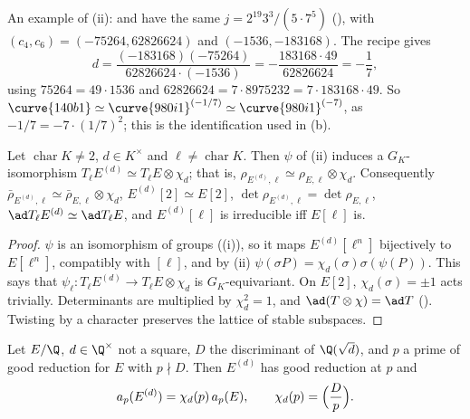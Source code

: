 \noindent An example of (ii):  and  have the same $j=2^{19}3^3/(5\cdot7^5)$ (), with
$(c_4,c_6)=(-75264,62826624)$ and $(-1536,-183168)$. The recipe gives
\[
d=\frac{(-183168)(-75264)}{62826624\cdot(-1536)}=-\frac{183168\cdot49}{62826624}=-\frac17,
\]
using $75264=49\cdot1536$ and $62826624=7\cdot8975232=7\cdot183168\cdot49$. So $\curve{140b1}\simeq\curve{980i1}^{(-1/7)}\simeq\curve{980i1}^{(-7)}$, as $-1/7=-7\cdot(1/7)^2$; this is the
identification used in (b).

\begin{theorem}\label{thm:ellcurves:twistgal}
Let $\operatorname{char}K\ne2$, $d\in K^\times$ and $\ell\ne\operatorname{char}K$. Then $\psi$ of (ii) induces a $G_K$-isomorphism $T_\ell E^{(d)}\simeq T_\ell E\otimes\chi_d$; that is,
$\rho_{E^{(d)},\ell}\simeq\rho_{E,\ell}\otimes\chi_d$. Consequently $\bar\rho_{E^{(d)},\ell}\simeq\bar\rho_{E,\ell}\otimes\chi_d$, $E^{(d)}[2]\simeq E[2]$, $\det\rho_{E^{(d)},\ell}=\det\rho_{E,\ell}$,
$\ad T_\ell E^{(d)}\simeq\ad T_\ell E$, and $E^{(d)}[\ell]$ is irreducible iff $E[\ell]$ is.
\end{theorem}

\begin{proof}
$\psi$ is an isomorphism of groups ((i)), so it maps $E^{(d)}[\ell^n]$ bijectively to $E[\ell^n]$, compatibly with $[\ell]$, and by (ii)
$\psi(\sigma P)=\chi_d(\sigma)\sigma(\psi(P))$. This says that $\psi_\ell\colon T_\ell E^{(d)}\to T_\ell E\otimes\chi_d$ is $G_K$-equivariant. On $E[2]$, $\chi_d(\sigma)=\pm1$ acts trivially. Determinants are
multiplied by $\chi_d^2=1$, and $\ad(T\otimes\chi)=\ad T$ (). Twisting by a character preserves the lattice of stable subspaces.
\end{proof}

\begin{corollary}[$a_p$ of a twist]\label{cor:ellcurves:twistap}
Let $E/\Q$, $d\in\Q^\times$ not a square, $D$ the discriminant of $\Q(\sqrt d)$, and $p$ a prime of good reduction for $E$ with $p\nmid D$. Then $E^{(d)}$ has good reduction at $p$ and
\[
a_p(E^{(d)})=\chi_d(p)\,a_p(E),\qquad\chi_d(p)=\Bigl(\frac Dp\Bigr).
\]
\end{corollary}

